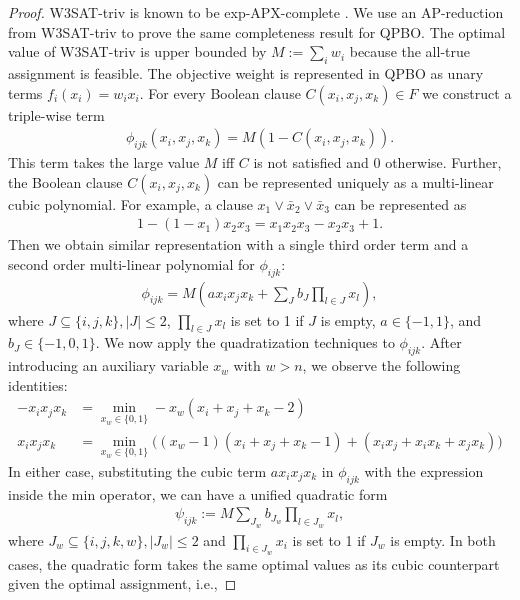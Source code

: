 \begin{proof}
W3SAT-triv is known to be exp-APX-complete \cite{ausiello1999complexity}. We use an AP-reduction from W3SAT-triv to prove the same completeness result for QPBO. The optimal value of W3SAT-triv is upper bounded by $M := \sum_{i}w_i$ because the all-true assignment is feasible.
The objective weight is represented in QPBO as unary terms $f_i(x_i) = w_i x_i$. 
For every Boolean clause $C(x_i,x_j,x_k) \in F$ we construct a triple-wise term
\begin{align}
\phi_{ijk}(x_i,x_j,x_k) = M(1-C(x_i,x_j,x_k)).
\end{align}
This term takes the large value $M$ iff $C$ is not satisfied and $0$ otherwise. Further, the Boolean clause $C(x_i,x_j,x_k)$ can be represented uniquely as a multi-linear cubic polynomial. For example, a clause $x_1 \lor {\bar x}_2 \lor {\bar x}_3$ can be represented as
\begin{align}
    1 - (1 - x_1) x_2 x_3 = x_1 x_2 x_3 - x_2 x_3 + 1.
\end{align}
Then we obtain similar representation with a single third order term and a second order multi-linear polynomial for $\phi_{ijk}$:
\begin{align}
\phi_{ijk} = M(a x_i x_j x_k + \sum_{J} b_{J} \prod_{l\in J} x_l),
\end{align}
where $J\subseteq \{i,j,k\}, |J|\leq 2$, $\prod_{l\in J} x_l$ is set to 1 if $J$ is empty, $a \in \{-1, 1\}$, and $b_{J} \in \{-1, 0, 1\}$. We now apply the quadratization techniques \cite{ishikawa2011transformation} to $\phi_{ijk}$. After introducing an auxiliary variable $x_w$ with $w > n$, we observe the following identities:
\begin{align}
-x_i x_j x_k & = \min_{x_w\in \{0, 1\}} -x_w (x_i+x_j+x_k-2) \\
x_i x_j x_k & =  \min_{x_w\in \{0, 1\}} \big( (x_w{-}1) (x_i{+}x_j{+}x_k{-}1) + (x_i x_j{+}x_i x_k{+}x_j x_k) \Big)
\end{align}
In either case, substituting the cubic term $a x_i x_j x_k$ in $\phi_{ijk}$ with the expression inside the min operator, we can have a unified quadratic form
\begin{align}
\psi_{ijk} := M \sum_{J_w}b_{J_w}\prod_{l\in J_w} x_l,
\end{align}
where $J_w \subseteq \{i, j, k, w\}, |J_w|\leq 2$ and $\prod_{i\in J_w} x_i$ is set to 1 if $J_w$ is empty. In both cases, the quadratic form takes the same optimal values as its cubic counterpart given the optimal assignment, i.e.,

\end{proof}
